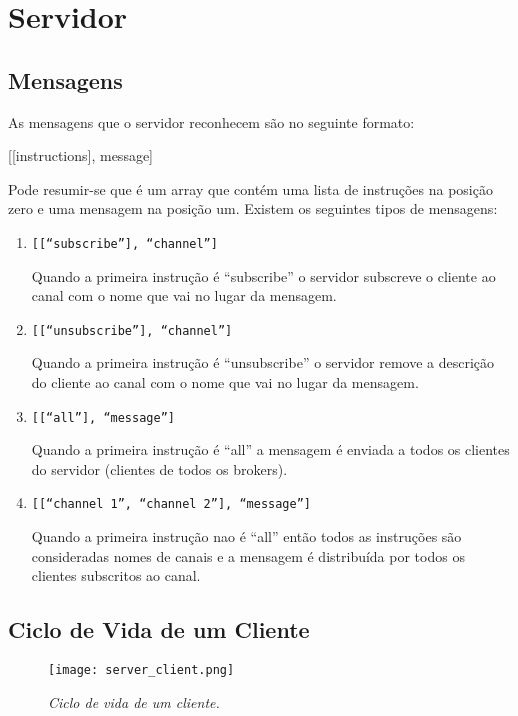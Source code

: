\section{Servidor}

\subsection{Mensagens}

As mensagens que o servidor reconhecem são no seguinte formato:

[[instructions], message]

Pode resumir-se que é um array que contém uma lista de instruções na posição zero e uma mensagem na posição um. Existem os seguintes tipos de mensagens:

\begin{enumerate}
\item
\texttt{[[``subscribe''], ``channel'']}

Quando a primeira instrução é ``subscribe'' o servidor subscreve o cliente ao canal com o nome que vai no lugar da mensagem.

\item
\texttt{[[``unsubscribe''], ``channel'']}

Quando a primeira instrução é ``unsubscribe'' o servidor remove a descrição do cliente ao canal com o nome que vai no lugar da mensagem.

\item
\texttt{[[``all''], ``message'']}

Quando a primeira instrução é ``all'' a mensagem é enviada a todos os clientes do servidor (clientes de todos os brokers).

\item
\texttt{[[``channel 1'', ``channel 2''], ``message'']}

Quando a primeira instrução nao é ``all'' então todos as instruções são consideradas nomes de canais e a mensagem é distribuída por todos os clientes subscritos ao canal.
\end{enumerate}

\subsection{Ciclo de Vida de um Cliente}

\begin{figure}[H]
\centering
\texttt{[image: server\_client.png]}
\caption{\textit{Ciclo de vida de um cliente.}}
\label{fig:server-client}
\end{figure}


